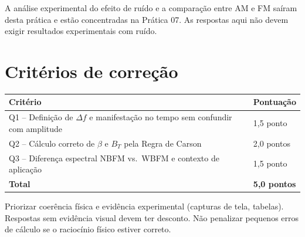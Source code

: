 \documentclass[11pt,a4paper]{article}
\begin{document}
\begin{nota}
A análise experimental do efeito de ruído e a comparação entre AM e FM saíram
desta prática e estão concentradas na Prática 07. As respostas aqui não devem
exigir resultados experimentais com ruído.
\end{nota}

\section*{Critérios de correção}
\begin{tabular}{ll}
  \toprule
  Critério & Pontuação \\
  \midrule
  Q1 -- Definição de $\Delta f$ e manifestação no tempo sem confundir com amplitude & 1,5 ponto \\
  Q2 -- Cálculo correto de $\beta$ e $B_T$ pela Regra de Carson                    & 2,0 pontos \\
  Q3 -- Diferença espectral NBFM vs.\ WBFM e contexto de aplicação                & 1,5 ponto \\
  \midrule
  \textbf{Total} & \textbf{5,0 pontos} \\
  \bottomrule
\end{tabular}

\bigskip
\begin{nota}
  Priorizar coerência física e evidência experimental (capturas de tela, tabelas).
  Respostas sem evidência visual devem ter desconto. Não penalizar pequenos erros
  de cálculo se o raciocínio físico estiver correto.
\end{nota}
\end{document}
